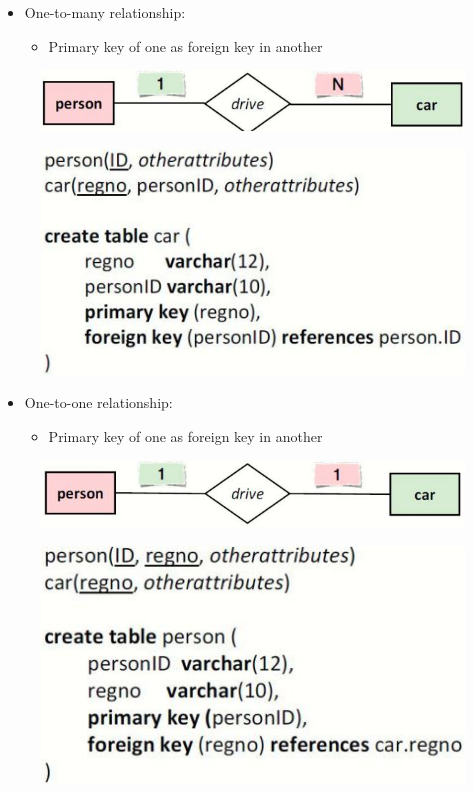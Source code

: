 \documentclass[conference]{IEEEtran}
\begin{document}
\begin{itemize}
    \item One-to-many relationship:
    \begin{itemize}
        \item Primary key of one as foreign key in another
    \end{itemize}
\end{itemize}
\begin{figure} [h!]
    \centering
    \includegraphics[scale=0.5]{Ex26.JPG}
\end{figure}
\begin{figure} [h!]
    \centering
    \includegraphics[scale=0.5]{Ex27.JPG}
\end{figure}

\begin{itemize}
    \item One-to-one relationship:
    \begin{itemize}
        \item Primary key of one as foreign key in another
    \end{itemize}
\end{itemize}
\begin{figure} [h!]
    \centering
    \includegraphics[scale=0.5]{Ex28.JPG}
\end{figure}
\begin{figure} [h!]
    \centering
    \includegraphics[scale=0.5]{Ex29.JPG}
\end{figure}
\end{document}
